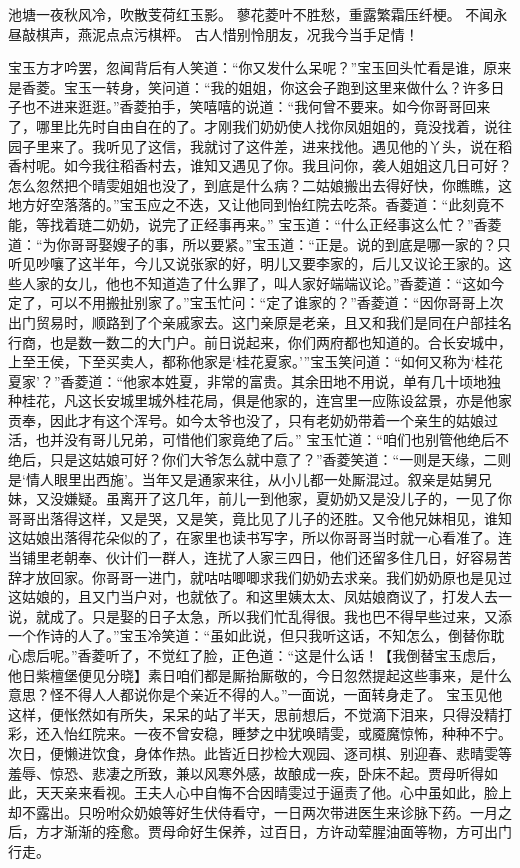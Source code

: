 \documentclass[12pt,oneside]{book}
\begin{document}
池塘一夜秋风冷，吹散芰荷红玉影。
蓼花菱叶不胜愁，重露繁霜压纤梗。
不闻永昼敲棋声，燕泥点点污棋枰。
古人惜别怜朋友，况我今当手足情！

宝玉方才吟罢，忽闻背后有人笑道：“你又发什么呆呢？”宝玉回头忙看是谁，原来是香菱。宝玉一转身，笑问道：“我的姐姐，你这会子跑到这里来做什么？许多日子也不进来逛逛。”香菱拍手，笑嘻嘻的说道：“我何曾不要来。如今你哥哥回来了，哪里比先时自由自在的了。才刚我们奶奶使人找你凤姐姐的，竟没找着，说往园子里来了。我听见了这信，我就讨了这件差，进来找他。遇见他的丫头，说在稻香村呢。如今我往稻香村去，谁知又遇见了你。我且问你，袭人姐姐这几日可好？怎么忽然把个晴雯姐姐也没了，到底是什么病？二姑娘搬出去得好快，你瞧瞧，这地方好空落落的。”宝玉应之不迭，又让他同到怡红院去吃茶。香菱道：“此刻竟不能，等找着琏二奶奶，说完了正经事再来。”
宝玉道：“什么正经事这么忙？”香菱道：“为你哥哥娶嫂子的事，所以要紧。”宝玉道：“正是。说的到底是哪一家的？只听见吵嚷了这半年，今儿又说张家的好，明儿又要李家的，后儿又议论王家的。这些人家的女儿，他也不知道造了什么罪了，叫人家好端端议论。”香菱道：“这如今定了，可以不用搬扯别家了。”宝玉忙问：“定了谁家的？”香菱道：“因你哥哥上次出门贸易时，顺路到了个亲戚家去。这门亲原是老亲，且又和我们是同在户部挂名行商，也是数一数二的大门户。前日说起来，你们两府都也知道的。合长安城中，上至王侯，下至买卖人，都称他家是‘桂花夏家。’”宝玉笑问道：“如何又称为‘桂花夏家’？”香菱道：“他家本姓夏，非常的富贵。其余田地不用说，单有几十顷地独种桂花，凡这长安城里城外桂花局，俱是他家的，连宫里一应陈设盆景，亦是他家贡奉，因此才有这个浑号。如今太爷也没了，只有老奶奶带着一个亲生的姑娘过活，也并没有哥儿兄弟，可惜他们家竟绝了后。”
宝玉忙道：“咱们也别管他绝后不绝后，只是这姑娘可好？你们大爷怎么就中意了？”香菱笑道：“一则是天缘，二则是‘情人眼里出西施’。当年又是通家来往，从小儿都一处厮混过。叙亲是姑舅兄妹，又没嫌疑。虽离开了这几年，前儿一到他家，夏奶奶又是没儿子的，一见了你哥哥出落得这样，又是哭，又是笑，竟比见了儿子的还胜。又令他兄妹相见，谁知这姑娘出落得花朵似的了，在家里也读书写字，所以你哥哥当时就一心看准了。连当铺里老朝奉、伙计们一群人，连扰了人家三四日，他们还留多住几日，好容易苦辞才放回家。你哥哥一进门，就咕咕唧唧求我们奶奶去求亲。我们奶奶原也是见过这姑娘的，且又门当户对，也就依了。和这里姨太太、凤姑娘商议了，打发人去一说，就成了。只是娶的日子太急，所以我们忙乱得很。我也巴不得早些过来，又添一个作诗的人了。”宝玉冷笑道：“虽如此说，但只我听这话，不知怎么，倒替你耽心虑后呢。”香菱听了，不觉红了脸，正色道：“这是什么话！【我倒替宝玉虑后，他日紫檀堡便见分晓】素日咱们都是厮抬厮敬的，今日忽然提起这些事来，是什么意思？怪不得人人都说你是个亲近不得的人。”一面说，一面转身走了。
宝玉见他这样，便怅然如有所失，呆呆的站了半天，思前想后，不觉滴下泪来，只得没精打彩，还入怡红院来。一夜不曾安稳，睡梦之中犹唤晴雯，或魇魔惊怖，种种不宁。次日，便懒进饮食，身体作热。此皆近日抄检大观园、逐司棋、别迎春、悲晴雯等羞辱、惊恐、悲凄之所致，兼以风寒外感，故酿成一疾，卧床不起。贾母听得如此，天天亲来看视。王夫人心中自悔不合因晴雯过于逼责了他。心中虽如此，脸上却不露出。只吩咐众奶娘等好生伏侍看守，一日两次带进医生来诊脉下药。一月之后，方才渐渐的痊愈。贾母命好生保养，过百日，方许动荤腥油面等物，方可出门行走。
\end{document}
